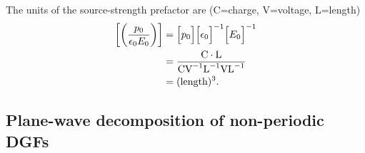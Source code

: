 \documentclass[letterpaper]{article}
\begin{document}
The units of the source-strength prefactor are
($\text{C}$=charge, $\text{V}$=voltage, $\text{L}$=length)
\begin{align*}
\left[\left(\frac{p_0}{\epsilon_0 E_0}\right)\right]
&= \Big[p_0\Big]\Big[\epsilon_0\Big]^{-1} \Big[E_0\Big]^{-1} 
\\
&= \frac{\text{C}\cdot \text{L}}
        {\text{C} \text{V}^{-1} \text{L}^{-1} \text{V} \text{L}^{-1}}
\\
&= (\text{length})^3.
\end{align*}


\subsection{Plane-wave decomposition of non-periodic DGFs}
\end{document}

